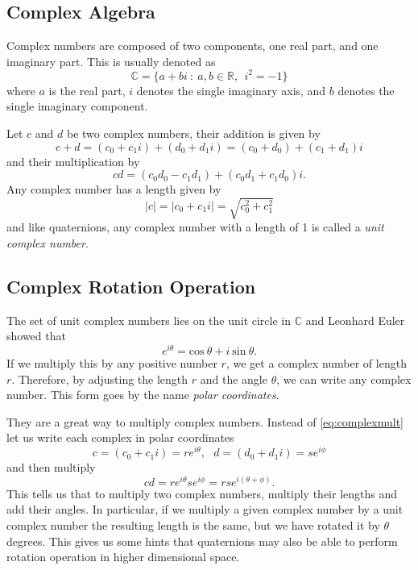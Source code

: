 \subsection{Complex Algebra}
Complex numbers are composed of two components, one real part, and one imaginary part.
This is usually denoted as
\begin{equation}
\mathbb{C} = \{a + bi~:~a,b \in \mathbb{R}, ~~i^2=-1\}
\label{eq:complexalgebra}
\end{equation}
where $a$ is the real part, $i$ denotes the single imaginary axis, and $b$ denotes the single imaginary component.

Let $c$ and $d$ be two complex numbers, their addition is given by
\begin{equation}
c + d = (c_0 + c_1i) + (d_0 + d_1i) = (c_0+d_0) + (c_1+d_1)i
\label{eq:complexaddition}
\end{equation}
and their multiplication by
\begin{equation}
cd = (c_0d_0 - c_1d_1) + (c_0d_1 + c_1d_0)i.
\label{eq:complexmult}
\end{equation}
Any complex number has a length given by
\begin{equation}
|c| = |c_0+c_1i| = \sqrt{c_0^2 + c_1^2}
\label{eq:complexlength}
\end{equation}
and like quaternions, any complex number with a length of 1 is called a \textit{unit complex number}.


\subsection{Complex Rotation Operation}
The set of unit complex numbers lies on the unit circle in $\mathbb{C}$ and Leonhard Euler showed that
\begin{equation}
e^{i\theta} = \mbox{cos}~\theta + i~\mbox{sin}~\theta.
\label{eq:euler}
\end{equation}
If we multiply this by any positive number $r$, we get a complex number of length $r$.
Therefore, by adjusting the length $r$ and the angle $\theta$, we can write any complex number.
This form goes by the name \textit{polar coordinates}.

They are a great way to multiply complex numbers. 
Instead of \eqref{eq:complexmult} let us write each complex in polar coordinates
\begin{equation*}
c = (c_0+c_1i) = re^{i\theta}, ~~~d = (d_0+d_1i) = se^{i\phi}
\end{equation*}
and then multiply
\begin{equation*}
cd = re^{i\theta}se^{i\phi} = rse^{i(\theta+\phi)}.
\end{equation*}
This tells us that to multiply two complex numbers, multiply their lengths and add their angles.
In particular, if we multiply a given complex number by a unit complex number the resulting length is the same, but we have rotated it by $\theta$ degrees. 
This gives us some hints that quaternions may also be able to perform rotation operation in higher dimensional space.



